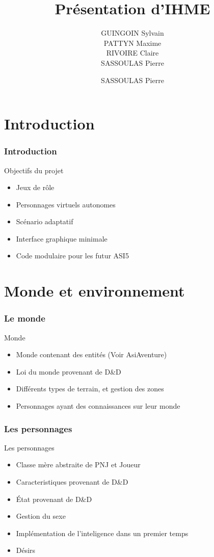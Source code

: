 \documentclass{beamer}
\title{Présentation d'IHME}
\author{GUINGOIN Sylvain \\PATTYN Maxime \\RIVOIRE Claire \\SASSOULAS Pierre}
\begin{document}
\frame{\titlepage}
\author{}
\frame{\tableofcontents}

\author{SASSOULAS Pierre}
\section{Introduction}
\begin{frame}
  \frametitle{Introduction}
  
  \begin{block}{Objectifs du projet}
    \begin{itemize}
        \item Jeux de rôle
        \item Personnages virtuels autonomes
        \item Scénario adaptatif 
        \item Interface graphique minimale
        \item Code modulaire pour les futur ASI5
    \end{itemize} 
    \end{block}
  
\end{frame}

\section{Monde et environnement}
\begin{frame}
    \frametitle{Le monde}
    \begin{block}{Monde}
    \begin{itemize}
        \item Monde contenant des entités (Voir AsiAventure)
        \item Loi du monde provenant de D\&D
        \item Différents types de terrain, et gestion des zones
        \item Personnages ayant des connaissances sur leur monde
    \end{itemize} 
    \end{block}
\end{frame}

\begin{frame}
      \frametitle{Les personnages}
    \begin{block}{Les personnages}
    \begin{itemize}
        \item Classe mère abstraite de PNJ et Joueur
        \item Caracteristiques provenant de D\&D
        \item État provenant de D\&D
        \item Gestion du sexe
        \item Implémentation de l'inteligence dans un premier temps
        \item Désirs
    \end{itemize} 
    \end{block}
\end{frame}
\end{document}
